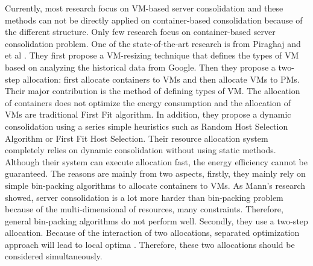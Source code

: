 Currently, most research focus on VM-based server consolidation and these methods can not be directly applied on container-based consolidation because of the different structure. Only few research focus on container-based server consolidation problem. One of the state-of-the-art research is from Piraghaj and et al \cite{Piraghaj:2015uf}. They first propose a VM-resizing technique that defines the types of VM based on analyzing the historical data from Google. Then they propose a two-step allocation: first allocate containers to VMs and then allocate VMs to PMs. Their major contribution is the method of defining types of VM. The allocation of containers does not optimize the energy consumption and the allocation of VMs are traditional First Fit algorithm. In addition, they propose a dynamic consolidation \cite{Piraghaj:2016bw} using a series simple heuristics such as Random Host Selection Algorithm or First Fit Host Selection. 
Their resource allocation system completely relies on dynamic consolidation without using static methods. Although their system can execute allocation fast, the energy efficiency cannot be guaranteed.
The reasons are mainly from two aspects, firstly, they mainly rely on simple bin-packing algorithms to allocate containers to VMs. As Mann's research \cite{Mann:2015ua} showed, server consolidation is a lot more harder than bin-packing problem because of the multi-dimensional of resources, many constraints. Therefore, general bin-packing algorithms do not perform well. Secondly, they use a two-step allocation. Because of the interaction of two allocations, separated optimization approach will lead to local optima \cite{Mann:2016hx}. Therefore, these two allocations should be considered simultaneously.


